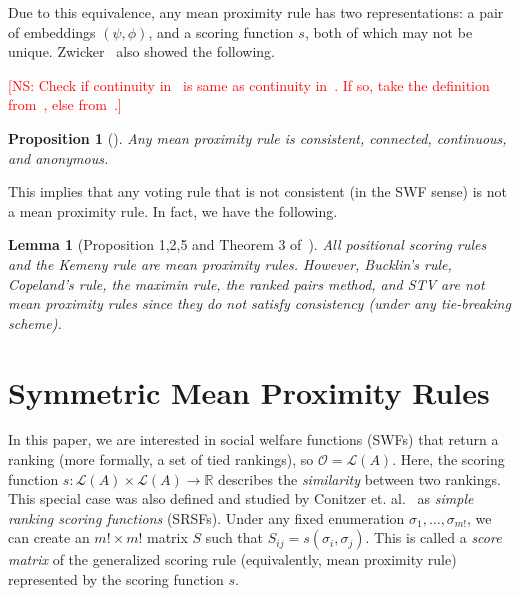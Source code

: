 \documentclass[10pt,letterpaper]{article}
\newcommand{\calL}{{\mathcal{L}}}
\newcommand{\rank}{{\calL(A)}}
\newcommand{\calO}{{\mathcal{O}}}
\newtheorem{lemma}{Lemma}
\newtheorem{proposition}{Proposition}
\newcommand{\kibitz}[2]{\ifnum\Comments=1\textcolor{#1}{#2}\fi}
\newcommand{\cns}[1]{\kibitz{red} {[NS: #1]}}
\begin{document}
Due to this equivalence, any mean proximity rule has two representations: a pair of embeddings $(\psi,\phi)$, and a scoring function $s$, both of which may not be unique. Zwicker~\cite{Zwicker08b} also showed the following. %

\cns{Check if continuity in~\cite{CRX09} is same as continuity in~\cite{Zwicker08a}. If so, take the definition from~\cite{Zwicker08a}, else from~\cite{CRX09}.}
\begin{proposition}[\cite{Zwicker08b}]
Any mean proximity rule is consistent, connected, continuous, and anonymous.
\label{prop:properties}
\end{proposition}

This implies that any voting rule that is not consistent (in the SWF sense) is not a mean proximity rule. In fact, we have the following.

\begin{lemma}[Proposition 1,2,5 and Theorem 3 of~\cite{CRX09}]
All positional scoring rules and the Kemeny rule are mean proximity rules. However, Bucklin's rule, Copeland's rule, the maximin rule, the ranked pairs method, and STV are not mean proximity rules since they do not satisfy consistency (under any tie-breaking scheme). 
\end{lemma}


\section{Symmetric Mean Proximity Rules}

In this paper, we are interested in social welfare functions (SWFs) that return a ranking (more formally, a set of tied rankings), so $\calO = \rank$. %
Here, the scoring function $s : \rank \times \rank \rightarrow \mathbb{R}$ describes the \emph{similarity} between two rankings. This special case was also defined and studied by Conitzer et. al.~\cite{CRX09} as \emph{simple ranking scoring functions} (SRSFs). Under any fixed enumeration $\sigma_1,\ldots,\sigma_{m!}$, we can create an $m! \times m!$ matrix $S$ such that $S_{ij} = s(\sigma_i,\sigma_j)$. This is called a \emph{score matrix} of the generalized scoring rule (equivalently, mean proximity rule) represented by the scoring function $s$. 
\end{document}
